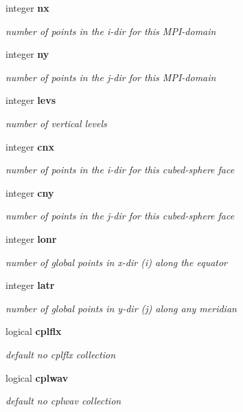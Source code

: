\begin{DoxyCompactItemize}
integer \textbf{ nx}
\begin{DoxyCompactList}\small\item\em number of points in the i-\/dir for this M\+P\+I-\/domain \end{DoxyCompactList}\item 
integer \textbf{ ny}
\begin{DoxyCompactList}\small\item\em number of points in the j-\/dir for this M\+P\+I-\/domain \end{DoxyCompactList}\item 
integer \textbf{ levs}
\begin{DoxyCompactList}\small\item\em number of vertical levels \end{DoxyCompactList}\item 
integer \textbf{ cnx}
\begin{DoxyCompactList}\small\item\em number of points in the i-\/dir for this cubed-\/sphere face \end{DoxyCompactList}\item 
integer \textbf{ cny}
\begin{DoxyCompactList}\small\item\em number of points in the j-\/dir for this cubed-\/sphere face \end{DoxyCompactList}\item 
integer \textbf{ lonr}
\begin{DoxyCompactList}\small\item\em number of global points in x-\/dir (i) along the equator \end{DoxyCompactList}\item 
integer \textbf{ latr}
\begin{DoxyCompactList}\small\item\em number of global points in y-\/dir (j) along any meridian \end{DoxyCompactList}\item 
logical \textbf{ cplflx}
\begin{DoxyCompactList}\small\item\em default no cplflx collection \end{DoxyCompactList}\item 
logical \textbf{ cplwav}
\begin{DoxyCompactList}\small\item\em default no cplwav collection \end{DoxyCompactList}\item 

\end{DoxyCompactItemize}
